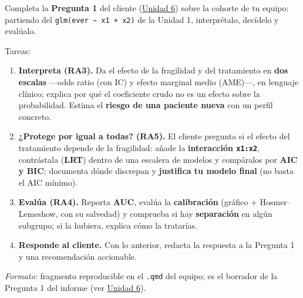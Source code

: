 \documentclass[
  letterpaper,
  DIV=11,
  numbers=noendperiod]{scrartcl}
\providecommand{\tightlist}{%
  \setlength{\itemsep}{0pt}\setlength{\parskip}{0pt}}\usepackage{longtable,booktabs,array}
\begin{document}
\begin{tcolorbox}[enhanced jigsaw, coltitle=black, rightrule=.15mm, arc=.35mm, leftrule=.75mm, colback=white, colbacktitle=quarto-callout-important-color!10!white, left=2mm, breakable, toptitle=1mm, toprule=.15mm, bottomtitle=1mm, titlerule=0mm, title=\textcolor{quarto-callout-important-color}{\faExclamation}\hspace{0.5em}{Tarea del estudiante (1.2) --- resuelve la Pregunta 1 del caso}, bottomrule=.15mm, opacityback=0, opacitybacktitle=0.6, colframe=quarto-callout-important-color-frame]

Completa la \textbf{Pregunta 1} del cliente
(\protect\hyperlink{sec-u16}{Unidad 6}) sobre la cohorte de tu equipo:
partiendo del \texttt{glm(ever\ \textasciitilde{}\ x1\ +\ x2)} de la
Unidad 1, interprétalo, decídelo y evalúalo.

Tareas:

\begin{enumerate}
\def\labelenumi{\arabic{enumi}.}
\tightlist
\item
  \textbf{Interpreta (RA3).} Da el efecto de la fragilidad y del
  tratamiento en \textbf{dos escalas} ---odds ratio (con IC) y efecto
  marginal medio (AME)---, en lenguaje clínico; explica por qué el
  coeficiente crudo no es un efecto sobre la probabilidad. Estima el
  \textbf{riesgo de una paciente nueva} con un perfil concreto.
\item
  \textbf{¿Protege por igual a todas? (RA5).} El cliente pregunta si el
  efecto del tratamiento depende de la fragilidad: añade la
  \textbf{interacción \texttt{x1:x2}}, contrástala (\textbf{LRT}) dentro
  de una escalera de modelos y compáralos por \textbf{AIC y BIC};
  documenta dónde discrepan y \textbf{justifica tu modelo final} (no
  basta el AIC mínimo).
\item
  \textbf{Evalúa (RA4).} Reporta \textbf{AUC}, evalúa la
  \textbf{calibración} (gráfico + Hosmer--Lemeshow, con su salvedad) y
  comprueba si hay \textbf{separación} en algún subgrupo; si la hubiera,
  explica cómo la tratarías.
\item
  \textbf{Responde al cliente.} Con lo anterior, redacta la respuesta a
  la Pregunta 1 y una recomendación accionable.
\end{enumerate}

\emph{Formato:} fragmento reproducible en el \texttt{.qmd} del equipo;
es el borrador de la Pregunta 1 del informe (ver
\protect\hyperlink{sec-u16}{Unidad 6}).

\end{tcolorbox}
\end{document}
